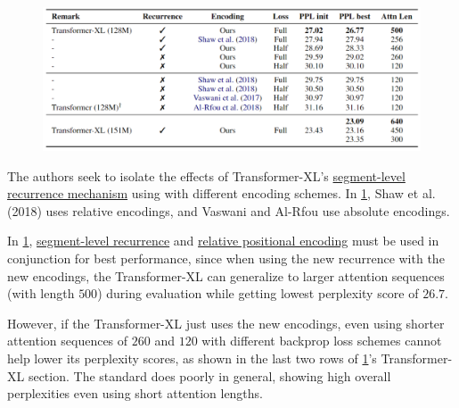 {
\begin{figure}
\begin{center}
    \vspace{-20pt}
    \includegraphics[width=\linewidth]{imgs/table_transXL_ablationREC.png}
\end{center}
\vspace{-20pt}
\vspace{25pt}
\label{tbl:transXL_ablationRECURR}
\end{figure}

The authors seek to isolate the effects of Transformer-XL's \hyperref[sec:SegmentLevelRec]{segment-level recurrence mechanism} using with different encoding schemes. In \cref{tbl:transXL_ablationRECURR}, Shaw et al. (2018) uses relative encodings, and Vaswani and Al-Rfou use absolute encodings. 

In \cref{tbl:transXL_ablationRECURR}, \hyperref[sec:SegmentLevelRec]{segment-level recurrence} and \hyperref[sec:RelativePosEnc]{relative positional encoding} must be used in conjunction for best performance, since when using the new recurrence with the new encodings, the Transformer-XL can generalize to larger attention sequences (with length $500$) during evaluation while getting lowest perplexity score of $26.7$. 


However, if the Transformer-XL just uses the new encodings, even using shorter attention sequences of $260$ and $120$ with different backprop loss schemes cannot help lower its perplexity scores, as shown in the last two rows of \cref{tbl:transXL_ablationRECURR}'s Transformer-XL section. The standard  does poorly in general, showing high overall perplexities even using short attention lengths. 
}